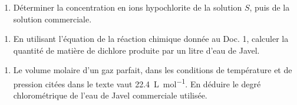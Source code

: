 \documentclass[a4paper,fontsize=10pt,fleqn]{scrartcl}%
\begin{document}
\begin{enumerate}[resume]
        \item Déterminer la concentration en ions hypochlorite de la solution $S$, puis de la solution commerciale.
\end{enumerate}
\noindent \fbox{\begin{minipage}{\linewidth}
    \vspace{18em} \hspace{\linewidth}
\end{minipage}}
\newpage
\begin{enumerate}[resume]
        \item En utilisant l'équation de la réaction chimique donnée au Doc. 1, calculer la quantité de matière de dichlore produite par un litre d'eau de Javel.
\end{enumerate}
\noindent \fbox{\begin{minipage}{\linewidth}
    \vspace{22em} \hspace{\linewidth}
\end{minipage}}

\begin{enumerate}[resume]
        \item Le volume molaire d'un gaz parfait, dans les conditions de température et de pression citées dans le texte vaut \SI{22,4}{\liter\per\mole}. En déduire le degré chlorométrique de l'eau de Javel commerciale utilisée.
    \end{enumerate}

\noindent \fbox{\begin{minipage}{\linewidth}
    \vspace{22em} \hspace{\linewidth}
\end{minipage}}
\end{document}
